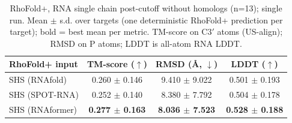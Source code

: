 \begin{table}[htbp]
\centering
\caption{RhoFold+, RNA single chain post-cutoff without homologs (n=13); single run. Mean $\pm$ s.d. over targets (one deterministic RhoFold+ prediction per target); bold = best mean per metric. TM-score on C3$'$ atoms (US-align); RMSD on P atoms; LDDT is all-atom RNA LDDT.}
\label{tab:rf_rna_single_chain_post_cutoff_without_homologs}
\begin{tabular}{lccc}
\toprule
RhoFold+ input & TM-score ($\uparrow$) & RMSD (\AA, $\downarrow$) & LDDT ($\uparrow$) \\
\midrule
SHS (RNAfold) & 0.260 $\pm$ 0.146 & 9.410 $\pm$ 9.022 & 0.501 $\pm$ 0.193 \\
SHS (SPOT-RNA) & 0.252 $\pm$ 0.140 & 8.380 $\pm$ 7.792 & 0.504 $\pm$ 0.178 \\
SHS (RNAformer) & \textbf{0.277 $\pm$ 0.163} & \textbf{8.036 $\pm$ 7.523} & \textbf{0.528 $\pm$ 0.188} \\
\bottomrule
\end{tabular}
\end{table}

